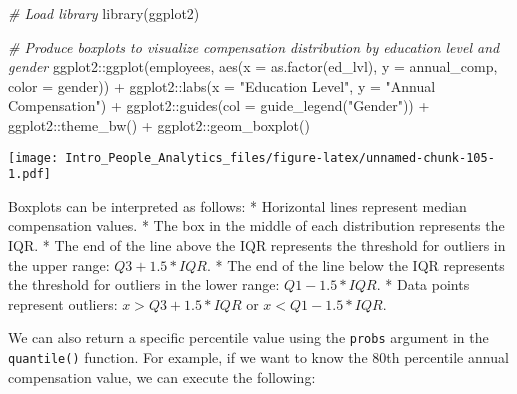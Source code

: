 \documentclass[
]{book}
\newenvironment{Shaded}{\begin{snugshade}}{\end{snugshade}}
\newcommand{\AttributeTok}[1]{\textcolor[rgb]{0.77,0.63,0.00}{#1}}
\newcommand{\CommentTok}[1]{\textcolor[rgb]{0.56,0.35,0.01}{\textit{#1}}}
\newcommand{\DecValTok}[1]{\textcolor[rgb]{0.00,0.00,0.81}{#1}}
\newcommand{\FunctionTok}[1]{\textcolor[rgb]{0.00,0.00,0.00}{#1}}
\newcommand{\NormalTok}[1]{#1}
\newcommand{\SpecialCharTok}[1]{\textcolor[rgb]{0.00,0.00,0.00}{#1}}
\newcommand{\StringTok}[1]{\textcolor[rgb]{0.31,0.60,0.02}{#1}}
\begin{document}
\begin{Shaded}
\begin{Highlighting}[]
\CommentTok{\# Load library}
\FunctionTok{library}\NormalTok{(ggplot2)}

\CommentTok{\# Produce boxplots to visualize compensation distribution by education level and gender}
\NormalTok{ggplot2}\SpecialCharTok{::}\FunctionTok{ggplot}\NormalTok{(employees, }\FunctionTok{aes}\NormalTok{(}\AttributeTok{x =} \FunctionTok{as.factor}\NormalTok{(ed\_lvl), }\AttributeTok{y =}\NormalTok{ annual\_comp, }\AttributeTok{color =}\NormalTok{ gender)) }\SpecialCharTok{+}
\NormalTok{ggplot2}\SpecialCharTok{::}\FunctionTok{labs}\NormalTok{(}\AttributeTok{x =} \StringTok{"Education Level"}\NormalTok{, }\AttributeTok{y =} \StringTok{"Annual Compensation"}\NormalTok{) }\SpecialCharTok{+} 
\NormalTok{ggplot2}\SpecialCharTok{::}\FunctionTok{guides}\NormalTok{(}\AttributeTok{col =} \FunctionTok{guide\_legend}\NormalTok{(}\StringTok{"Gender"}\NormalTok{)) }\SpecialCharTok{+}
\NormalTok{ggplot2}\SpecialCharTok{::}\FunctionTok{theme\_bw}\NormalTok{() }\SpecialCharTok{+}
\NormalTok{ggplot2}\SpecialCharTok{::}\FunctionTok{geom\_boxplot}\NormalTok{()}
\end{Highlighting}
\end{Shaded}

\texttt{[image: Intro\_People\_Analytics\_files/figure-latex/unnamed-chunk-105-1.pdf]}

Boxplots can be interpreted as follows:
* Horizontal lines represent median compensation values.
* The box in the middle of each distribution represents the IQR.
* The end of the line above the IQR represents the threshold for outliers in the upper range: \(Q3 + 1.5 * IQR\).
* The end of the line below the IQR represents the threshold for outliers in the lower range: \(Q1 - 1.5 * IQR\).
* Data points represent outliers: \(x > Q3 + 1.5 * IQR\) or \(x < Q1 - 1.5 * IQR\).

We can also return a specific percentile value using the \texttt{probs} argument in the \texttt{quantile()} function. For example, if we want to know the 80th percentile annual compensation value, we can execute the following:

\begin{Shaded}
\end{Shaded}
\end{document}
